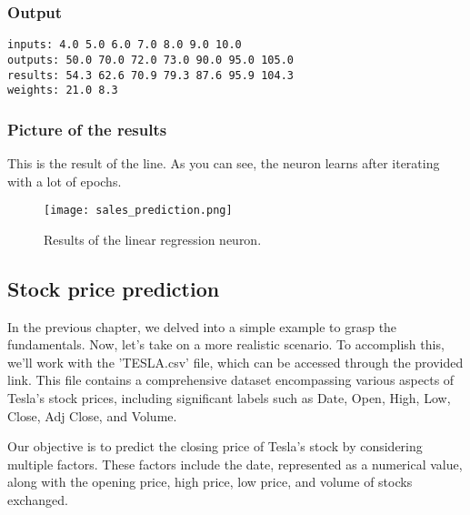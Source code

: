 \subsubsection{Output}
\begin{verbatim}
inputs: 4.0 5.0 6.0 7.0 8.0 9.0 10.0 
outputs: 50.0 70.0 72.0 73.0 90.0 95.0 105.0 
results: 54.3 62.6 70.9 79.3 87.6 95.9 104.3 
weights: 21.0 8.3  
\end{verbatim}
\subsubsection{Picture of the results}
This is the result of the line. As you can see, the neuron learns after iterating with a lot of epochs.

\begin{figure}[H]
  \centering
  \texttt{[image: sales\_prediction.png]}
  \caption{Results of the linear regression neuron.}
\end{figure}

\subsection{Stock price prediction}
In the previous chapter, we delved into a simple example to grasp the fundamentals. Now, let's take on a more
realistic scenario. To accomplish this, we'll work with the 'TESLA.csv' file, which can be accessed through the
provided link. This file contains a comprehensive dataset encompassing various aspects of Tesla's stock prices,
including significant labels such as Date, Open, High, Low, Close, Adj Close, and Volume.

Our objective is to predict the closing price of Tesla's stock by considering multiple factors. These factors
include the date, represented as a numerical value, along with the opening price, high price, low price, and
volume of stocks exchanged.

